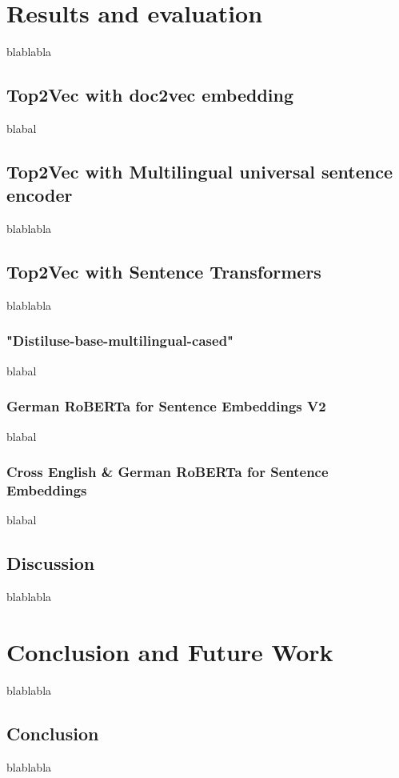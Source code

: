 \documentclass[fontsize=12pt,a4paper,twoside,openany]{scrbook}
\begin{document}
\chapter{Results and evaluation}

blablabla

\section{Top2Vec with doc2vec embedding}
\label{sec:doc2vec_results}
blabal

\section{Top2Vec with Multilingual universal sentence encoder}
\label{sec:muse_results}

blablabla

\section{Top2Vec with Sentence Transformers}
\label{sec:senttrans_results}
blablabla


\subsection{"Distiluse-base-multilingual-cased"}
\label{sec:muse_result}
blabal


\subsection{German RoBERTa for Sentence Embeddings V2}
\label{sec:roberta_de_result}
blabal

\subsection{Cross English \& German RoBERTa for Sentence Embeddings}
\label{sec:roberta_de_en_result}
blabal

\section{Discussion}
\label{sec:discussion}
blablabla


\chapter{Conclusion and Future Work}
blablabla

\section{Conclusion}
blablabla
\end{document}
